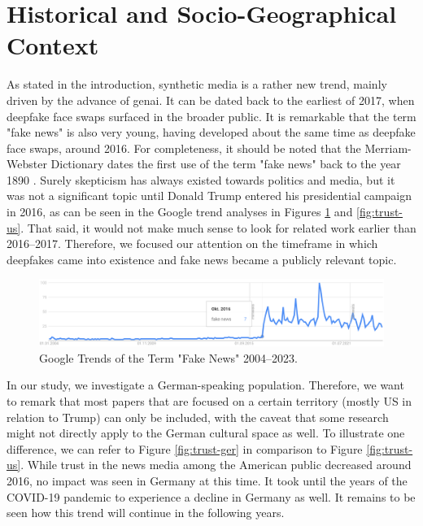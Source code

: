 \documentclass[
  a4paper,  %
  twoside,  %
  bibliography=totoc,
  headsepline,
  cleardoublepage=empty,
  parskip=half,
  draft=false
]{scrbook}
\begin{document}
\section{Historical and Socio-Geographical Context}
\label{sec:hist-context}
As stated in the introduction, synthetic media is a rather new trend, mainly driven by the advance of \gls{genai}. It can be dated back to the earliest of 2017, when deepfake face swaps surfaced in the broader public. It is remarkable that the term "fake news" is also very young, having developed about the same time as deepfake face swaps, around 2016. For completeness, it should be noted that the Merriam-Webster Dictionary dates the first use of the term "fake news" back to the year 1890 \cite{merriam-websterdictionaryRealStoryFake}. Surely skepticism has always existed towards politics and media, but it was not a significant topic until Donald Trump entered his presidential campaign in 2016, as can be seen in the Google trend analyses in Figures \ref{fig:gtrend-fake-news} and \ref{fig:trust-us}. That said, it would not make much sense to look for related work earlier than 2016–2017. Therefore, we focused our attention on the timeframe in which deepfakes came into existence and fake news became a publicly relevant topic.

\begin{figure}[h]
  \centering
  \includegraphics[width=1\textwidth]{./graphics/gtrends_fakenews_1011-2311.png}
  \caption{Google Trends of the Term "Fake News" 2004–2023.}
  \label{fig:gtrend-fake-news}
\end{figure}

In our study, we investigate a German-speaking population. Therefore, we want to remark that most papers that are focused on a certain territory (mostly US in relation to Trump) can only be included, with the caveat that some research might not directly apply to the German cultural space as well. To illustrate one difference, we can refer to Figure \ref{fig:trust-ger} in comparison to Figure \ref{fig:trust-us}. While trust in the news media among the American public decreased around 2016, no impact was seen in Germany at this time. It took until the years of the COVID-19 pandemic to experience a decline in Germany as well. It remains to be seen how this trend will continue in the following years.
\end{document}
